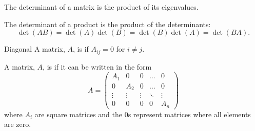 The determinant of a matrix is the product of its eigenvalues.

The determinant of a product is the product of the determinants:
\begin{equation}
    \det(AB) = \det(A)\det(B) = \det(B)\det(A) = \det(BA).
\end{equation}

\begin{dfn}{Diagonal}{}
    A matrix, \(A\), is  if \(A_{ij} = 0\) for \(i \ne j\).
    
    A matrix, \(A\), is  if it can be written in the form
    \begin{equation}
        A = 
        \begin{pmatrix}
            A_1 & 0 & 0 & \dots & 0\\
            0 & A_2 & 0 & \dots & 0\\
            \vdots & \vdots & \vdots & \ddots & \vdots\\
            0 & 0 & 0 & 0 & A_n
        \end{pmatrix}
    \end{equation}
    where \(A_i\) are square matrices and the \(0\)s represent matrices where all elements are zero.
\end{dfn}    

